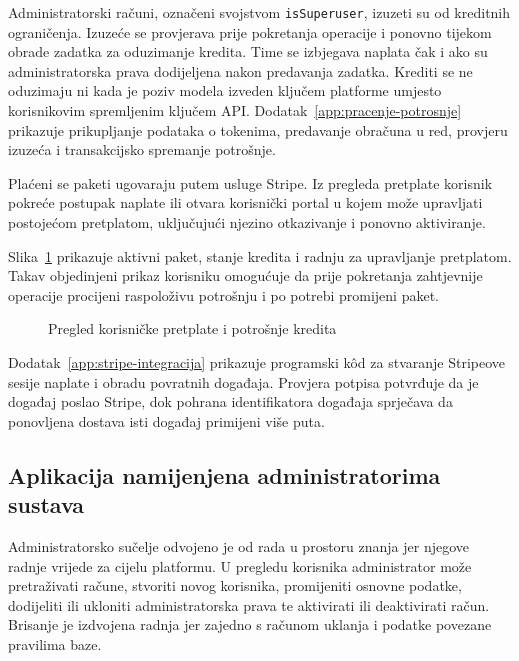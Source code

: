 Administratorski računi, označeni svojstvom \texttt{isSuperuser}, izuzeti su od kreditnih ograničenja. Izuzeće se provjerava prije pokretanja operacije i ponovno tijekom obrade zadatka za oduzimanje kredita. Time se izbjegava naplata čak i ako su administratorska prava dodijeljena nakon predavanja zadatka. Krediti se ne oduzimaju ni kada je poziv modela izveden ključem platforme umjesto korisnikovim spremljenim ključem API. Dodatak~\ref{app:pracenje-potrosnje} prikazuje prikupljanje podataka o tokenima, predavanje obračuna u red, provjeru izuzeća i transakcijsko spremanje potrošnje.

Plaćeni se paketi ugovaraju putem usluge Stripe. Iz pregleda pretplate korisnik pokreće postupak naplate ili otvara korisnički portal u kojem može upravljati postojećom pretplatom, uključujući njezino otkazivanje i ponovno aktiviranje.

Slika~\ref{fig:korisnicka-pretplata} prikazuje aktivni paket, stanje kredita i radnju za upravljanje pretplatom. Takav objedinjeni prikaz korisniku omogućuje da prije pokretanja zahtjevnije operacije procijeni raspoloživu potrošnju i po potrebi promijeni paket.

\begin{figure}[H]
    \centering
    \caption{Pregled korisničke pretplate i potrošnje kredita}
    \label{fig:korisnicka-pretplata}
\end{figure}

Dodatak~\ref{app:stripe-integracija} prikazuje programski kôd za stvaranje Stripeove sesije naplate i obradu povratnih događaja. Provjera potpisa potvrđuje da je događaj poslao Stripe, dok pohrana identifikatora događaja sprječava da ponovljena dostava isti događaj primijeni više puta.

\subsection{Aplikacija namijenjena administratorima sustava}

Administratorsko sučelje odvojeno je od rada u prostoru znanja jer njegove radnje vrijede za cijelu platformu. U pregledu korisnika administrator može pretraživati račune, stvoriti novog korisnika, promijeniti osnovne podatke, dodijeliti ili ukloniti administratorska prava te aktivirati ili deaktivirati račun. Brisanje je izdvojena radnja jer zajedno s računom uklanja i podatke povezane pravilima baze.

